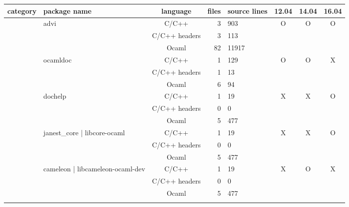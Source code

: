 \documentclass[11pt,a4paper]{article}
\begin{document}
\begin{table}[h,t]
\centering

\begin{tabular}{|>{\centering}m{3cm}| m{3cm}|c|r|m{1cm}| c| c|c|}
 \hline
 category  &package name & language & files & source lines  & 12.04 & 14.04&16.04\\ 
 \hline

 \multirow{18}{3cm}{packages written in OCaml} & \multirow{3}{3cm}{advi} & C/C++ & 3 & 903 & \multirow{3}{*}{O} & \multirow{3}{*}{O} & \multirow{3}{*}{O}\\
 \cline{3-5}
 &  &                           C/C++ headers & 3 & 113 & & & \\
 \cline{3-5}
 & &                           Ocaml & 82 & 11917 & & & \\
 \cline{2-8}

 &\multirow{3}{3cm}{ocamldoc} & C/C++ & 1 & 129 & \multirow{3}{*}{O} & \multirow{3}{*}{O} & \multirow{3}{*}{X}\\
\cline{3-5}
& &                           C/C++ headers & 1 & 13 & & & \\
\cline{3-5}
& &                          Ocaml & 6 & 94 & & & \\
\cline{2-8}

 & \multirow{3}{*}{dochelp} & C/C++ & 1 & 19 & \multirow{3}{*}{X} & \multirow{3}{*}{X} & \multirow{3}{*}{O}\\
 \cline{3-5}
 &  &                           C/C++ headers & 0 & 0 & & & \\
 \cline{3-5}
 & &                           Ocaml & 5 & 477 & & & \\
 \cline{2-8}

 & \multirow{3}{3cm}{janest\_core | libcore-ocaml} & C/C++ & 1 & 19 & \multirow{3}{*}{X} & \multirow{3}{*}{X} & \multirow{3}{*}{O}\\
 \cline{3-5}
 &  &                           C/C++ headers & 0 & 0 & & & \\
 \cline{3-5}
 & &                           Ocaml & 5 & 477 & & & \\
 \cline{2-8}


& \multirow{3}{3cm}{cameleon | libcameleon-ocaml-dev} & C/C++ & 1 & 19 & \multirow{3}{*}{X} & \multirow{3}{*}{O} & \multirow{3}{*}{X}\\
 \cline{3-5}
 &  &                           C/C++ headers & 0 & 0 & & & \\
 \cline{3-5}
 & &                           Ocaml & 5 & 477 & & & \\
 \cline{2-8}



\end{tabular}
\end{table}
\end{document}
